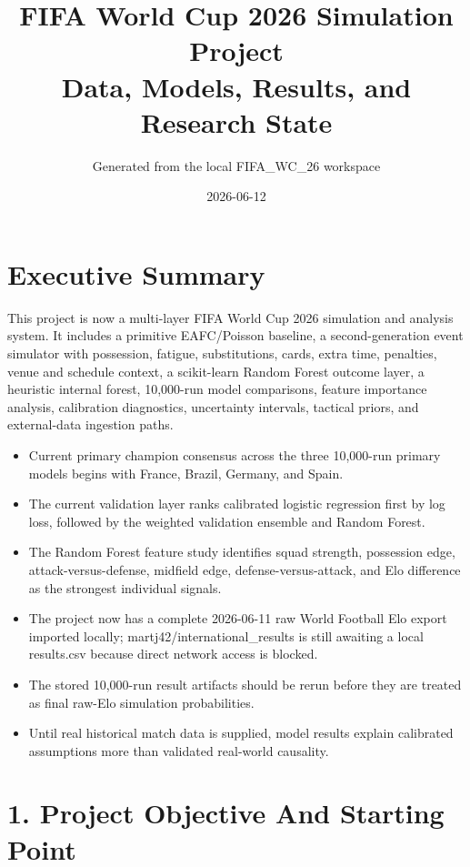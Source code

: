 \documentclass[10pt]{article}
\title{\textbf{FIFA World Cup 2026 Simulation Project}\\Data, Models, Results, and Research State}
\author{Generated from the local FIFA\_WC\_26 workspace}
\date{2026-06-12}
\begin{document}
\maketitle

\tableofcontents

\newpage

\section{Executive Summary}

This project is now a multi-layer FIFA World Cup 2026 simulation and analysis system. It includes a primitive EAFC/Poisson baseline, a second-generation event simulator with possession, fatigue, substitutions, cards, extra time, penalties, venue and schedule context, a scikit-learn Random Forest outcome layer, a heuristic internal forest, 10,000-run model comparisons, feature importance analysis, calibration diagnostics, uncertainty intervals, tactical priors, and external-data ingestion paths.

\begin{itemize}
  \item Current primary champion consensus across the three 10,000-run primary models begins with France, Brazil, Germany, and Spain.
  \item The current validation layer ranks calibrated logistic regression first by log loss, followed by the weighted validation ensemble and Random Forest.
  \item The Random Forest feature study identifies squad strength, possession edge, attack-versus-defense, midfield edge, defense-versus-attack, and Elo difference as the strongest individual signals.
  \item The project now has a complete 2026-06-11 raw World Football Elo export imported locally; martj42/international\_results is still awaiting a local results.csv because direct network access is blocked.
  \item The stored 10,000-run result artifacts should be rerun before they are treated as final raw-Elo simulation probabilities.
  \item Until real historical match data is supplied, model results explain calibrated assumptions more than validated real-world causality.
\end{itemize}

\newpage

\section{1. Project Objective And Starting Point}
\end{document}
